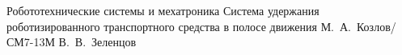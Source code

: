 \documentclass{bmstu}
\begin{document}
                {Робототехнические системы и мехатроника}                       %
                {Система удержания роботизированного транспортного средства в
                полосе движения}                                                %
                {М.~А.~Козлов/СМ7-13М}                                          %
                {В.~В.~Зеленцов}                                                %
                {}                                                              %
\end{document}
